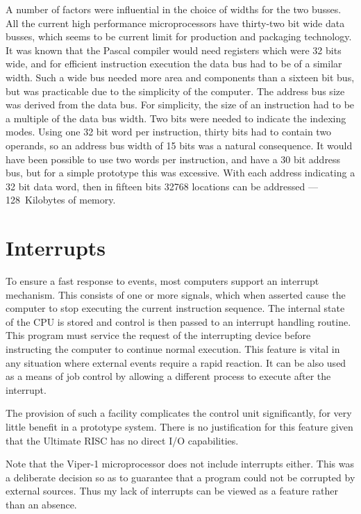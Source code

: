 A number of factors  were influential in the choice 
of widths for the two busses. 
All the current high performance microprocessors have thirty-two bit wide data busses,
which seems to be current limit for production and packaging technology.
It was known that the Pascal compiler would need  registers which were 32 bits wide, and
for efficient instruction execution the data bus had to be of a similar width.
Such a  wide bus needed more area and components than a sixteen bit bus, but was practicable due to the simplicity of the computer.
The address bus size was derived from the data bus. 
For simplicity, the size of an instruction had to be a multiple of the data bus width. 
Two bits were needed to indicate the indexing  modes. 
Using one 32 bit word  per instruction, thirty bits had to contain two 
operands, so an address bus width of 15 bits was a natural 
consequence. 
It would have been possible to use two words per 
instruction, and have a 30 bit address bus, but for a simple 
prototype this was excessive. With each address indicating a 32 bit 
data word, then in fifteen bits 32768 locations can be addressed ---128~Kilobytes of memory.

\section{Interrupts}

To ensure a fast response to  events, most computers support an interrupt mechanism. 
This consists of one or more  signals, which when asserted cause the computer to stop executing the current instruction sequence.
The internal state of the CPU is stored and control is then passed to an interrupt handling routine.
This program must service the request of the interrupting device before instructing the computer to continue normal execution.
This feature is vital in any  situation where external events require a rapid reaction.
It can be also used as a means of job control by allowing a different process  to execute after the interrupt.

The provision of such a facility complicates the control unit significantly, for very little benefit in a prototype system.
There is no justification for this feature given that the Ultimate RISC has no direct I/O capabilities.

Note that the Viper-1 microprocessor does not include interrupts either.
This was a deliberate decision so as to guarantee that a program could not be corrupted by external sources.
Thus my lack of interrupts can be viewed as a feature rather than an absence.


